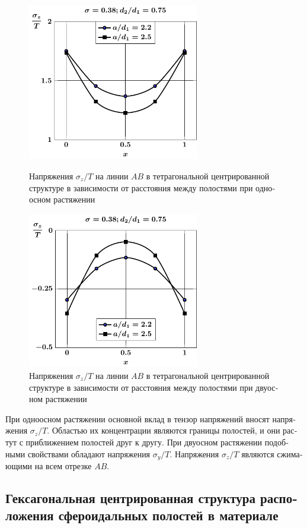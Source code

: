 \begin{russian}
\begin{figure}[h!]
\centering\footnotesize
\parbox[b]{7.5cm}{\centering\includegraphics[width=7.5cm]{cav9-a-d75-t1-sig_z.pdf}
\caption{Напряжения $\sigma_z/T$ на линии $AB$ в тетрагональной центрированной структуре в зависимости от расстояния между полостями при одноосном растяжении 
\label{f:9:40}}}\hfil\hfil
\parbox[b]{7.5cm}{\centering\includegraphics[width=7.5cm]{cav9-a-d75-t2-sig_z.pdf}
\caption{Напряжения $\sigma_z/T$ на линии $AB$ в тетрагональной центрированной структуре в зависимости от расстояния между полостями при двуосном растяжении
\label{f:9:41}}}
\end{figure}

При одноосном растяжении основной вклад в тензор напряжений вносят напряжения $\sigma_z/T$. Областью их концентрации являются границы полостей, и они растут с приближением полостей друг к другу. При двуосном растяжении подобными свойствами обладают напряжения $\sigma_y/T$. Напряжения $\sigma_z/T$ являются сжимающими на всем отрезке $AB$.

\subsection{Гексагональная центрированная структура расположения сфероидальных полостей в материале}


\end{russian}
